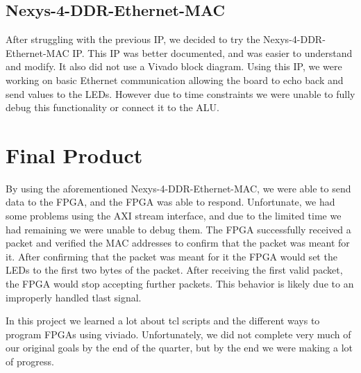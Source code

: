 \documentclass{article}
\begin{document}
\subsection*{Nexys-4-DDR-Ethernet-MAC}

After struggling with the previous IP, we decided to try the Nexys-4-DDR-Ethernet-MAC IP. This IP was better documented, and was easier to understand and modify. It also did not use a Vivado block diagram. Using this IP, we were working on basic Ethernet communication allowing the board to echo back and send values to the LEDs. However due to time constraints we were unable to fully debug this functionality or connect it to the ALU.
\section*{Final Product}

By using the aforementioned Nexys-4-DDR-Ethernet-MAC, we were able to send data to the FPGA, and the FPGA was able to respond. Unfortunate, we had some problems using the AXI stream interface, and due to the limited time we had remaining we were unable to debug them. The FPGA successfully received a packet and verified the MAC addresses to confirm that the packet was meant for it. After confirming that the packet was meant for it the FPGA would set the LEDs to the first two bytes of the packet. After receiving the first valid packet, the FPGA would stop accepting further packets. This behavior is likely due to an improperly handled tlast signal.

In this project we learned a lot about tcl scripts and the different ways to program FPGAs using viviado. Unfortunately, we did not complete very much of our original goals by the end of the quarter, but by the end we were making a lot of progress.
\end{document}
